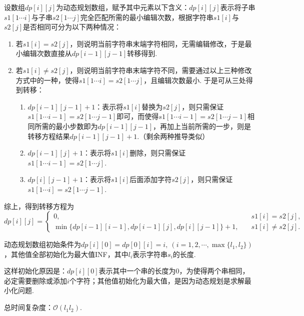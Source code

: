 \documentclass[12pt, a4paper, oneside]{ctexart}
\numberwithin{equation}{section}  %
\def\O{\mathcal{O}}         %
\begin{document}
    设数组$dp[i][j]$为动态规划数组，赋予其中元素以下含义：$dp[i][j]$表示将子串$s1[1\cdots i]$与子串$s2[1\cdots j]$完全匹配所需的最小编辑次数，根据字符串$s1[i]$与$s2[j]$是否相同可分为以下两种情况：
    \begin{enumerate}
        \item 若$s1[i] = s2[j]$，则说明当前字符串末端字符相同，无需编辑修改，于是最小编辑次数直接从$dp[i-1][j-1]$转移得到.
        \item 若$s1[i]\neq s2[j]$，则说明当前字符串末端字符不同，需要通过以上三种修改方式中的一种，使得$s1[1\cdots i]=s2[1\cdots j]$，且编辑次数最小. 于是可从三处得到转移：
        \begin{enumerate}
            \item $dp[i-1][j-1]+1$：表示将$s1[i]$替换为$s2[j]$，则只需保证$s1[1\cdots i-1]=s2[1\cdots j-1]$即可，而使得$s1[1\cdots i-1]=s2[1\cdots j-1]$相同所需的最小步数即为$dp[i-1][j-1]$，再加上当前所需的一步，则是转移方程结果$dp[i-1][j-1]+1$.（剩余两种推导类似）
            \item $dp[i-1][j]+1$：表示将$s1[i]$删除，则只需保证$s1[1\cdots i-1] = s2[1\cdots j]$.
            \item $dp[i][j-1]+1$：表示将$s1[i]$后面添加字符$s2[j]$，则只需保证$s1[1\cdots i] = s2[1\cdots j-1]$.
        \end{enumerate}
    \end{enumerate}
    综上，得到转移方程为
    \begin{equation*}
        dp[i][j] = \begin{cases}
            0,&\quad s1[i] = s2[j],\\
            \min\{dp[i-1][i-1], dp[i-1][j], dp[i][j-1]\}+1,&\quad s1[i]\neq s2[j].
        \end{cases}
    \end{equation*}

    动态规划数组初始条件为$dp[i][0] = dp[0][i] = i,\ (i = 1,2,\cdots, \max\{l_1,l_2\})$，其他值全部初始化为最大值INF，其中$l_i$表示字符串$s_i$的长度.
    
    这样初始化原因是：$dp[i][0]$表示其中一个串的长度为$0$，为使得两个串相同，必定需要删除或添加$i$个字符；其他值初始化为最大值，是因为动态规划是求解最小化问题.

    总时间复杂度：$\O(l_1l_2)$.
\end{document}
